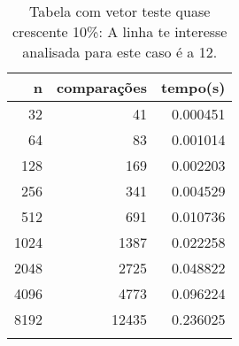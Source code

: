 \begin{table}[ht]
\centering
\begin{tabular}{rrr} \toprule
        n &    comparações &       tempo(s) \\ \midrule
      32  &             41 &      0.000451 \\
      64  &             83 &      0.001014 \\
     128  &            169 &      0.002203 \\
     256  &            341 &      0.004529 \\
     512  &            691 &      0.010736 \\
    1024  &           1387 &      0.022258 \\
    2048  &           2725 &      0.048822 \\
    4096  &           4773 &      0.096224 \\
    8192  &          12435 &      0.236025 \\
\bottomrule\addlinespace
\end{tabular}
\caption{Tabela com vetor teste quase crescente 10\%: A linha te interesse analisada para este caso é a 12.}
\label{tab:quicksortQuaseCresc10}
\end{table}
